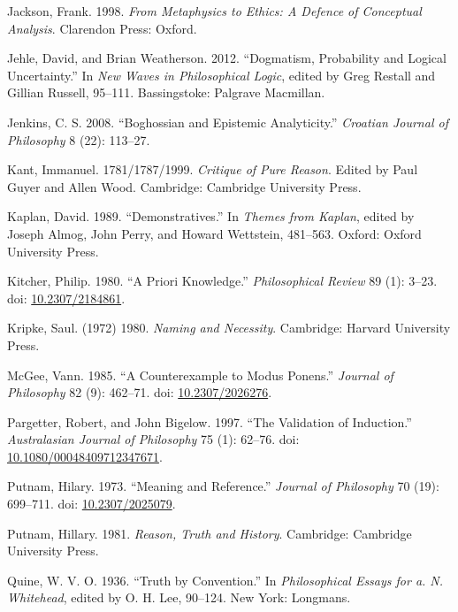 \documentclass[
  11pt,
  letterpaper,
  DIV=11,
  numbers=noendperiod,
  twoside]{scrartcl}
\newlength{\cslhangindent}
\newenvironment{CSLReferences}[2] %
 {\begin{list}{}{%
  \setlength{\itemindent}{0pt}
  \setlength{\leftmargin}{0pt}
  \setlength{\parsep}{0pt}
  \ifodd #1
   \setlength{\leftmargin}{\cslhangindent}
   \setlength{\itemindent}{-1\cslhangindent}
  \fi
  \setlength{\itemsep}{#2\baselineskip}}}
 {\end{list}}
\begin{document}
\begin{CSLReferences}{1}{0}
Jackson, Frank. 1998. \emph{From Metaphysics to Ethics: A Defence of
Conceptual Analysis}. Clarendon Press: Oxford.

Jehle, David, and Brian Weatherson. 2012. {``Dogmatism, Probability and
Logical Uncertainty.''} In \emph{New Waves in Philosophical Logic},
edited by Greg Restall and Gillian Russell, 95--111. Bassingstoke:
Palgrave Macmillan.

Jenkins, C. S. 2008. {``Boghossian and Epistemic Analyticity.''}
\emph{Croatian Journal of Philosophy} 8 (22): 113--27.

Kant, Immanuel. 1781/1787/1999. \emph{Critique of Pure Reason}. Edited
by Paul Guyer and Allen Wood. Cambridge: Cambridge University Press.

Kaplan, David. 1989. {``Demonstratives.''} In \emph{Themes from Kaplan},
edited by Joseph Almog, John Perry, and Howard Wettstein, 481--563.
Oxford: Oxford University Press.

Kitcher, Philip. 1980. {``A Priori Knowledge.''} \emph{Philosophical
Review} 89 (1): 3--23. doi:
\href{https://doi.org/10.2307/2184861}{10.2307/2184861}.

Kripke, Saul. (1972) 1980. \emph{Naming and Necessity}. Cambridge:
Harvard University Press.

McGee, Vann. 1985. {``A Counterexample to Modus Ponens.''} \emph{Journal
of Philosophy} 82 (9): 462--71. doi:
\href{https://doi.org/10.2307/2026276}{10.2307/2026276}.

Pargetter, Robert, and John Bigelow. 1997. {``The Validation of
Induction.''} \emph{Australasian Journal of Philosophy} 75 (1): 62--76.
doi:
\href{https://doi.org/10.1080/00048409712347671}{10.1080/00048409712347671}.

Putnam, Hilary. 1973. {``Meaning and Reference.''} \emph{Journal of
Philosophy} 70 (19): 699--711. doi:
\href{https://doi.org/10.2307/2025079}{10.2307/2025079}.

Putnam, Hillary. 1981. \emph{Reason, Truth and History}. Cambridge:
Cambridge University Press.

Quine, W. V. O. 1936. {``Truth by Convention.''} In \emph{Philosophical
Essays for a. N. Whitehead}, edited by O. H. Lee, 90--124. New York:
Longmans.


\end{CSLReferences}
\end{document}
